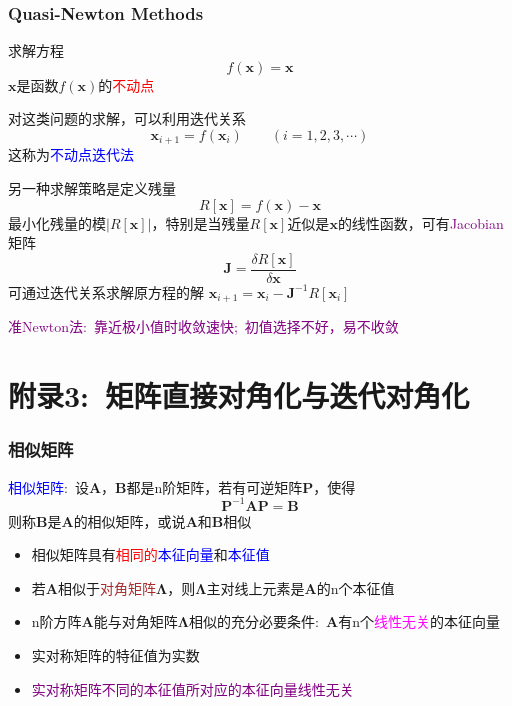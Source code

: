 \documentclass[cjk,slidestop,compress,mathserif,blue]{beamer}
\begin{document}
\frame
{
	\frametitle{\textrm{Quasi-Newton Methods}}
	求解方程
	\begin{displaymath}
		f(\mathbf{x})=\mathbf{x}
	\end{displaymath}
	$\mathbf{x}$是函数$f(\mathbf{x})$的\textcolor{red}{不动点}
	
	对这类问题的求解，可以利用迭代关系
	\begin{displaymath}
		\mathbf{x}_{i+1}=f(\mathbf{x}_i)\qquad (i=1,2,3,\cdots)
	\end{displaymath}
	这称为\textcolor{blue}{不动点迭代法}

	另一种求解策略是定义残量
	\begin{displaymath}
		R[\mathbf{x}]=f(\mathbf{x})-\mathbf{x}
	\end{displaymath}
	最小化残量的模$|R[\mathbf{x}]|$，特别是当残量$R[\mathbf{x}]$近似是$\mathbf{x}$的线性函数，可有\textcolor{purple}{Jacobian}矩阵
	\begin{displaymath}
		\mathbf{J}=\dfrac{\delta R[\mathbf{x}]}{\delta\mathbf{x}}
	\end{displaymath}
	可通过迭代关系求解原方程的解
		$\mathbf{x}_{i+1}=\mathbf{x}_{i}-\mathbf{J}^{-1}R[\mathbf{x}_{i}]$

	\textcolor{purple}{准\textrm{Newton}法:~靠近极小值时收敛速快;~初值选择不好，易不收敛}
}

\section{附录3:~矩阵直接对角化与迭代对角化}
\frame
{
	\frametitle{相似矩阵}
\textcolor{blue}{相似矩阵}:~设$\mathbf{A}$，$\mathbf{B}$都是\textrm{n}阶矩阵，若有可逆矩阵$\mathbf{P}$，使得
	\begin{displaymath}
		\mathbf{P}^{-1}\mathbf{A}\mathbf{P}=\mathbf{B}
	\end{displaymath}
	则称$\mathbf{B}$是$\mathbf{A}$的相似矩阵，或说$\mathbf{A}$和$\mathbf{B}$相似
	\begin{itemize}
		\item 相似矩阵具有\textcolor{red}{相同的}\textcolor{blue}{本征向量}和\textcolor{blue}{本征值}
		\item 若$\mathbf{A}$相似于\textcolor{brown}{对角矩阵}$\boldsymbol{\Lambda}$，则$\boldsymbol{\Lambda}$主对线上元素是$\mathbf{A}$的\textrm{n}个本征值
		\item \textrm{n}阶方阵$\mathbf{A}$能与对角矩阵$\boldsymbol{\Lambda}$相似的充分必要条件:~$\mathbf{A}$有\textrm{n}个\textcolor{magenta}{线性无关}的本征向量
		\item 实对称矩阵的特征值为实数
		\item \textcolor{purple}{实对称矩阵不同的本征值所对应的本征向量线性无关}
	\end{itemize}
}
\end{document}
